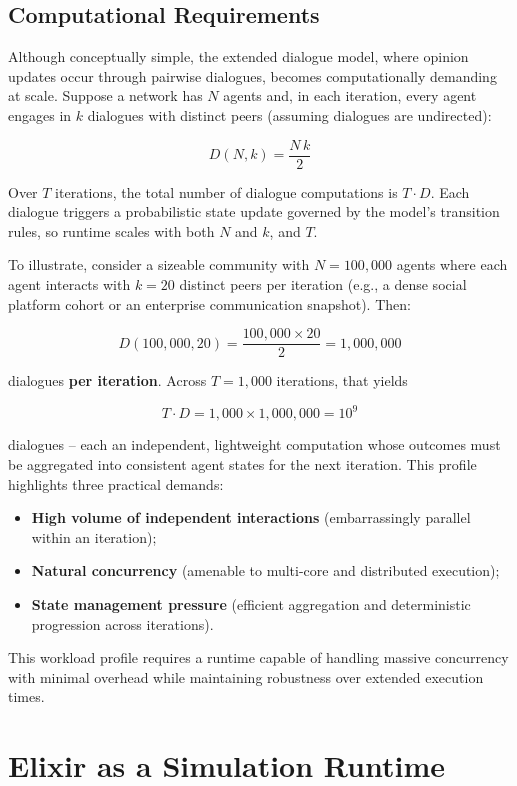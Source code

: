 \documentclass[
]{ceurart}
\begin{document}
\subsection{Computational Requirements}
Although conceptually simple, the extended dialogue model, where opinion updates occur through pairwise dialogues, becomes computationally demanding at scale. Suppose a network has $N$ agents and, in each iteration, every agent engages in $k$ dialogues with distinct peers (assuming dialogues are undirected):

\[
D(N,k)=\frac{N\,k}{2}
\]

Over $T$ iterations, the total number of dialogue computations is $T \cdot D$. Each dialogue triggers a probabilistic state update governed by the model’s transition rules, so runtime scales with both $N$ and $k$, and $T$.

To illustrate, consider a sizeable community with $N=100{,}000$ agents where each agent interacts with $k=20$ distinct peers per iteration (e.g., a dense social platform cohort or an enterprise communication snapshot). Then:

\[
D(100{,}000,20)=\frac{100{,}000 \times 20}{2}=1{,}000{,}000
\]

dialogues \textbf{per iteration}. Across $T=1{,}000$ iterations, that yields

\[T \cdot D=1{,}000 \times 1{,}000{,}000=10^{9}\]

dialogues – each an independent, lightweight computation whose outcomes must be aggregated into consistent agent states for the next iteration. This profile highlights three practical demands:
\begin{itemize}
	\item \textbf{High volume of independent interactions} (embarrassingly parallel within an iteration);
	\item \textbf{Natural concurrency} (amenable to multi-core and distributed execution);
	\item \textbf{State management pressure} (efficient aggregation and deterministic progression across iterations).
\end{itemize}

This workload profile requires a runtime capable of handling massive concurrency with minimal overhead while maintaining robustness over extended execution times.

\section{Elixir as a Simulation Runtime}
\end{document}

